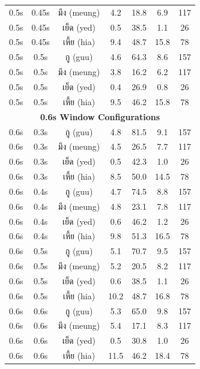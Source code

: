 \documentclass[11pt]{article}
\newcommand{\textthai}[1]{{\thaifont #1}}
\begin{document}
\begin{table}[H]
\begin{tabular}{|c|c|c|c|c|c|c|}
        0.5s & 0.45s & \textthai{มึง} (meung) & 4.2 & 18.8 & 6.9 & 117 \\
        0.5s & 0.45s & \textthai{เย็ด} (yed) & 0.5 & 38.5 & 1.1 & 26 \\
        0.5s & 0.45s & \textthai{เหี้ย} (hia) & 9.4 & 48.7 & 15.8 & 78 \\
        \hline
        0.5s & 0.5s & \textthai{กู} (guu) & 4.6 & 64.3 & 8.6 & 157 \\
        0.5s & 0.5s & \textthai{มึง} (meung) & 3.8 & 16.2 & 6.2 & 117 \\
        0.5s & 0.5s & \textthai{เย็ด} (yed) & 0.4 & 26.9 & 0.8 & 26 \\
        0.5s & 0.5s & \textthai{เหี้ย} (hia) & 9.5 & 46.2 & 15.8 & 78 \\
        \hline
        \multicolumn{7}{|c|}{\textbf{0.6s Window Configurations}} \\
        \hline
        0.6s & 0.3s & \textthai{กู} (guu) & 4.8 & 81.5 & 9.1 & 157 \\
        0.6s & 0.3s & \textthai{มึง} (meung) & 4.5 & 26.5 & 7.7 & 117 \\
        0.6s & 0.3s & \textthai{เย็ด} (yed) & 0.5 & 42.3 & 1.0 & 26 \\
        0.6s & 0.3s & \textthai{เหี้ย} (hia) & 8.5 & 50.0 & 14.5 & 78 \\
        \hline
        0.6s & 0.4s & \textthai{กู} (guu) & 4.7 & 74.5 & 8.8 & 157 \\
        0.6s & 0.4s & \textthai{มึง} (meung) & 4.8 & 23.1 & 7.8 & 117 \\
        0.6s & 0.4s & \textthai{เย็ด} (yed) & 0.6 & 46.2 & 1.2 & 26 \\
        0.6s & 0.4s & \textthai{เหี้ย} (hia) & 9.8 & 51.3 & 16.5 & 78 \\
        \hline
        0.6s & 0.5s & \textthai{กู} (guu) & 5.1 & 70.7 & 9.5 & 157 \\
        0.6s & 0.5s & \textthai{มึง} (meung) & 5.2 & 20.5 & 8.2 & 117 \\
        0.6s & 0.5s & \textthai{เย็ด} (yed) & 0.6 & 38.5 & 1.1 & 26 \\
        0.6s & 0.5s & \textthai{เหี้ย} (hia) & 10.2 & 48.7 & 16.8 & 78 \\
        \hline
        0.6s & 0.6s & \textthai{กู} (guu) & 5.3 & 65.0 & 9.8 & 157 \\
        0.6s & 0.6s & \textthai{มึง} (meung) & 5.4 & 17.1 & 8.3 & 117 \\
        0.6s & 0.6s & \textthai{เย็ด} (yed) & 0.5 & 30.8 & 1.0 & 26 \\
        0.6s & 0.6s & \textthai{เหี้ย} (hia) & 11.5 & 46.2 & 18.4 & 78 \\
        \hline
    \end{tabular}
\end{table}
\end{document}
